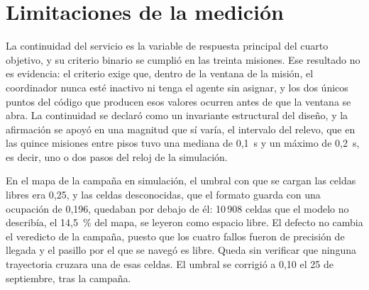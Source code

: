 \section{Limitaciones de la medición}
\label{sec:limitaciones}

La continuidad del servicio es la variable de respuesta principal del cuarto objetivo, y su criterio binario se cumplió en las treinta misiones. Ese resultado no es evidencia: el criterio exige que, dentro de la ventana de la misión, el coordinador nunca esté inactivo ni tenga el agente sin asignar, y los dos únicos puntos del código que producen esos valores ocurren antes de que la ventana se abra. La continuidad se declaró como un invariante estructural del diseño, y la afirmación se apoyó en una magnitud que sí varía, el intervalo del relevo, que en las quince misiones entre pisos tuvo una mediana de 0,1~s y un máximo de 0,2~s, es decir, uno o dos pasos del reloj de la simulación.

En el mapa de la campaña en simulación, el umbral con que se cargan las celdas libres era 0,25, y las celdas desconocidas, que el formato guarda con una ocupación de 0,196, quedaban por debajo de él: 10\,908 celdas que el modelo no describía, el 14,5~\% del mapa, se leyeron como espacio libre. El defecto no cambia el veredicto de la campaña, puesto que los cuatro fallos fueron de precisión de llegada y el pasillo por el que se navegó es libre. Queda sin verificar que ninguna trayectoria cruzara una de esas celdas. El umbral se corrigió a 0,10 el 25 de septiembre, tras la campaña.
